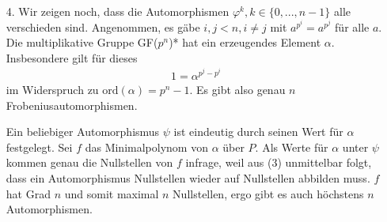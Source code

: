 \begin{solution}
\begin{itemize}
    \item[4.] Wir zeigen noch, dass die Automorphismen $\varphi^k, k \in \{0, ..., n-1\}$ alle verschieden sind. Angenommen, es gäbe $i, j < n, i \neq j$ mit $a^{p^i} = a^{p^j}$ für alle $a.$ Die multiplikative Gruppe GF($p^n$)* hat ein erzeugendes Element $\alpha.$ Insbesondere gilt für dieses
    \begin{align*}
        1 = \alpha^{p^j - p^i}
    \end{align*}
    im Widerspruch zu $\mathrm{ord}(\alpha) = p^n - 1$. Es gibt also genau $n$ Frobeniusautomorphismen.

    Ein beliebiger Automorphismus $\psi$ ist eindeutig durch seinen Wert für $\alpha$ festgelegt. Sei $f$ das Minimalpolynom von $\alpha$ über $P.$ Als Werte für $\alpha$ unter $\psi$ kommen genau die Nullstellen von $f$ infrage, weil aus (3) unmittelbar folgt, dass ein Automorphismus Nullstellen wieder auf Nullstellen abbilden muss. $f$ hat Grad $n$ und somit maximal $n$ Nullstellen, ergo gibt es auch höchstens $n$ Automorphismen.
  \end{itemize}
\end{solution}
